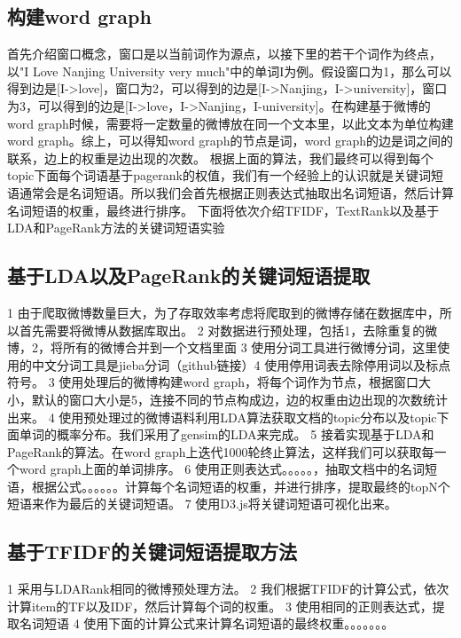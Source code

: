 \documentclass[master]{njuthesis}
\begin{document}
\subsection{构建word graph}

    首先介绍窗口概念，窗口是以当前词作为源点，以接下里的若干个词作为终点，以"I Love Nanjing University very much"中的单词I为例。假设窗口为1，那么可以得到边是[I->love]，窗口为2，可以得到的边是[I->Nanjing，I->university]，窗口为3，可以得到的边是[I->love，I->Nanjing，I-university]。在构建基于微博的word graph时候，需要将一定数量的微博放在同一个文本里，以此文本为单位构建word graph。综上，可以得知word graph的节点是词，word graph的边是词之间的联系，边上的权重是边出现的次数。
根据上面的算法，我们最终可以得到每个topic下面每个词语基于pagerank的权值，我们有一个经验上的认识就是关键词短语通常会是名词短语。所以我们会首先根据正则表达式抽取出名词短语，然后计算名词短语的权重，最终进行排序。
    下面将依次介绍TFIDF，TextRank以及基于LDA和PageRank方法的关键词短语实验

\subsection{基于LDA以及PageRank的关键词短语提取}

    1 由于爬取微博数量巨大，为了存取效率考虑将爬取到的微博存储在数据库中，所以首先需要将微博从数据库取出。
    2 对数据进行预处理，包括1，去除重复的微博，2，将所有的微博合并到一个文档里面 3 使用分词工具进行微博分词，这里使用的中文分词工具是jieba分词（github链接）4 使用停用词表去除停用词以及标点符号。
    3 使用处理后的微博构建word graph，将每个词作为节点，根据窗口大小，默认的窗口大小是5，连接不同的节点构成边，边的权重由边出现的次数统计出来。
    4 使用预处理过的微博语料利用LDA算法获取文档的topic分布以及topic下面单词的概率分布。我们采用了gensim的LDA来完成。
    5 接着实现基于LDA和PageRank的算法。在word graph上迭代1000轮终止算法，这样我们可以获取每一个word graph上面的单词排序。
    6 使用正则表达式。。。。。，抽取文档中的名词短语，根据公式。。。。。。计算每个名词短语的权重，并进行排序，提取最终的topN个短语来作为最后的关键词短语。
    7 使用D3.js将关键词短语可视化出来。

\subsection{基于TFIDF的关键词短语提取方法}

    1 采用与LDARank相同的微博预处理方法。
    2 我们根据TFIDF的计算公式，依次计算item的TF以及IDF，然后计算每个词的权重。
    3 使用相同的正则表达式，提取名词短语
    4 使用下面的计算公式来计算名词短语的最终权重。。。。。。。
\end{document}

